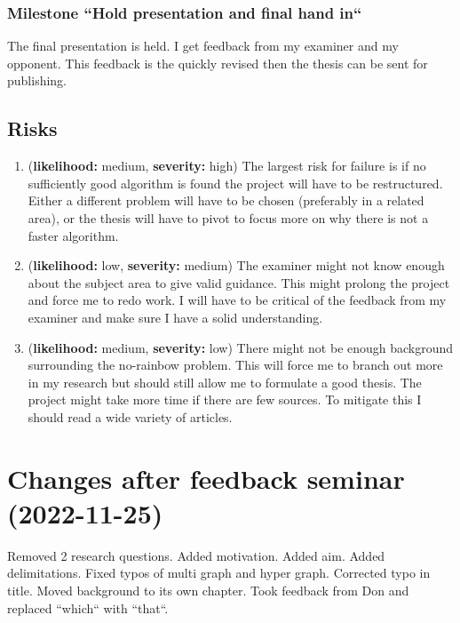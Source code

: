 \documentclass[msc,lith,english]{liuthesis}
\begin{document}
\subsection{Milestone ``Hold presentation and final hand in``}
The final presentation is held. I get feedback from my examiner and my
opponent. This feedback is the quickly revised then the thesis can be sent for
publishing.

\section{Risks}

\begin{enumerate}
  \item (\textbf{likelihood:} medium, \textbf{severity:} high)
    The largest risk for failure is if no sufficiently good algorithm
    is found the project will have to be restructured. Either a different problem
    will have to be chosen (preferably in a related area), or the thesis will have
    to pivot to focus more on why there is not a faster algorithm.

  \item (\textbf{likelihood:} low, \textbf{severity:} medium)
    The examiner might not know enough about the subject area to give valid
    guidance. This might prolong the project and force me to redo work. I will
    have to be critical of the feedback from my examiner and make sure I have a
    solid understanding.

  \item (\textbf{likelihood:} medium, \textbf{severity:} low)
    There might not be enough background surrounding the no-rainbow problem.
    This will force me to branch out more in my research but should still allow
    me to formulate a good thesis. The project might take more time if there
    are few sources. To mitigate this I should read a wide variety of articles.
\end{enumerate}

\printbibliography

\appendix
\chapter{Changes after feedback seminar (2022-11-25)}
Removed 2 research questions. Added motivation. Added aim. Added delimitations. Fixed typos of multi graph and hyper graph. Corrected typo in title. Moved background to its own chapter. Took feedback from Don and replaced ``which`` with ``that``.
\end{document}
